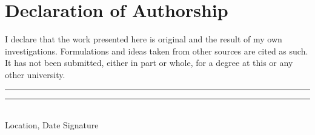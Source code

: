 \chapter{Declaration of Authorship}
\thispagestyle{empty}

\noindent%
I declare that the work presented here is original and the result of my own investigations. Formulations and ideas taken from other sources are cited as such. It has not been submitted, either in part or whole, for a degree at this or any other university.

\vfill

\rule[1em]{8em}{0.5pt}  \hfill \rule[1em]{8em}{0.5pt}\\ %
Location, Date \hfill Signature\\

